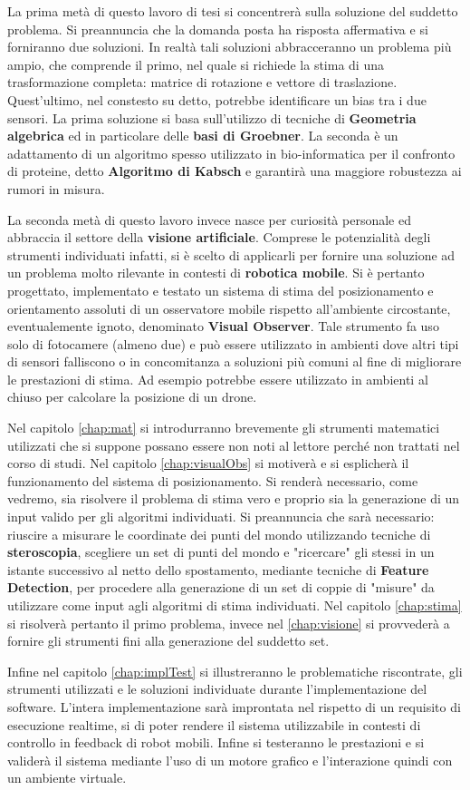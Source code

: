 La prima metà di questo lavoro di tesi si concentrerà sulla soluzione del suddetto problema. Si preannuncia che la domanda posta ha risposta affermativa e si forniranno due soluzioni. In realtà tali soluzioni abbracceranno un problema più ampio, che comprende il primo, nel quale si richiede la stima di una trasformazione completa: matrice di rotazione e vettore di traslazione. Quest'ultimo, nel constesto su detto, potrebbe identificare un bias tra i due sensori. 
La prima soluzione si basa sull'utilizzo di tecniche di \textbf{Geometria algebrica} ed in particolare delle \textbf{basi di Groebner}. La seconda è un adattamento di un algoritmo spesso utilizzato in bio-informatica per il confronto di proteine, detto \textbf{Algoritmo di Kabsch} e garantirà una maggiore robustezza ai rumori in misura.

La seconda metà di questo lavoro invece nasce per curiosità personale ed abbraccia il settore della \textbf{visione artificiale}. Comprese le potenzialità degli strumenti individuati infatti, si è scelto di applicarli per fornire una soluzione ad un problema molto rilevante in contesti di \textbf{robotica mobile}. Si è pertanto progettato, implementato e testato un sistema di stima del posizionamento e orientamento assoluti di un osservatore mobile rispetto all'ambiente circostante, eventualemente ignoto, denominato \textbf{Visual Observer}. Tale strumento fa uso solo di fotocamere (almeno due) e può essere utilizzato in ambienti dove altri tipi di sensori falliscono o in concomitanza a soluzioni più comuni al fine di migliorare le prestazioni di stima. Ad esempio potrebbe essere utilizzato in ambienti al chiuso per calcolare la posizione di un drone.

Nel capitolo \ref{chap:mat} si introdurranno brevemente gli strumenti matematici utilizzati che si suppone possano essere non noti al lettore perché non trattati nel corso di studi.
Nel capitolo \ref{chap:visualObs} si motiverà e si esplicherà il funzionamento del sistema di posizionamento. Si renderà necessario, come vedremo, sia risolvere il problema di stima vero e proprio sia la generazione di un input valido per gli algoritmi individuati. Si preannuncia che sarà necessario: riuscire a misurare le coordinate dei punti del mondo utilizzando tecniche di \textbf{steroscopia}, scegliere un set di punti del mondo e "ricercare" gli stessi in un istante successivo al netto dello spostamento, mediante tecniche di \textbf{Feature Detection}, per procedere alla generazione di un set di coppie di "misure" da utilizzare come input agli algoritmi di stima individuati. Nel capitolo \ref{chap:stima} si risolverà pertanto il primo problema, invece nel \ref{chap:visione} si provvederà a fornire gli strumenti fini alla generazione del suddetto set.

Infine nel capitolo \ref{chap:implTest} si illustreranno le problematiche riscontrate, gli strumenti utilizzati e le soluzioni individuate durante l'implementazione del software. L'intera implementazione sarà improntata nel rispetto di un requisito di esecuzione realtime, si di poter rendere il sistema utilizzabile in contesti di controllo in feedback di robot mobili. Infine si testeranno le prestazioni e si validerà il sistema mediante l'uso di un motore grafico e l'interazione quindi con un ambiente virtuale.  